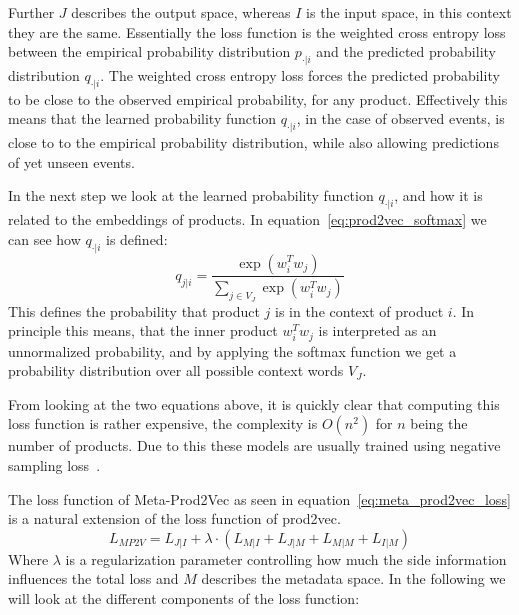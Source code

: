 Further $J$ describes the output space, whereas $I$ is the input space, in this context they are the same.
Essentially the loss function is the weighted cross entropy loss between the empirical probability distribution $p_{\cdot|i}$ and the predicted probability distribution $q_{\cdot|i}$.
The weighted cross entropy loss forces the predicted probability to be close to the observed empirical probability, for any product.
Effectively this means that the learned probability function $q_{\cdot|i}$, in the case of observed events, is close to to the empirical probability distribution, while also allowing predictions of yet unseen events.
\par
In the next step we look at the learned probability function $q_{\cdot|i}$, and how it is related to the embeddings of products.
In equation~\ref{eq:prod2vec_softmax} we can see how $q_{\cdot|i}$ is defined:
\begin{equation}\label{eq:prod2vec_softmax}
    q_{j|i} = \frac{\exp(w_i^Tw_j)}{\sum_{j \in V_J} \exp(w_i^Tw_{j})}
\end{equation}
This defines the probability that product $j$ is in the context of product $i$.
In principle this means, that the inner product $w_i^Tw_j$ is interpreted as an unnormalized probability, and by applying the softmax function we get a probability distribution over all possible context words $V_J$.
\par
From looking at the two equations above, it is quickly clear that computing this loss function is rather expensive, the complexity is $O(n^2)$ for $n$ being the number of products.
Due to this these models are usually trained using negative sampling loss~\cite{neg_sampling}.
\par
The loss function of Meta-Prod2Vec as seen in equation~\ref{eq:meta_prod2vec_loss} is a natural extension of the loss function of prod2vec.
\begin{equation}\label{eq:meta_prod2vec_loss}
    L_{MP2V} = L_{J|I} + \lambda \cdot (L_{M|I} + L_{J|M} + L_{M|M} + L_{I|M})
\end{equation}
Where $\lambda$ is a regularization parameter controlling how much the side information influences the total loss and $M$ describes the metadata space.
In the following we will look at the different components of the loss function:
